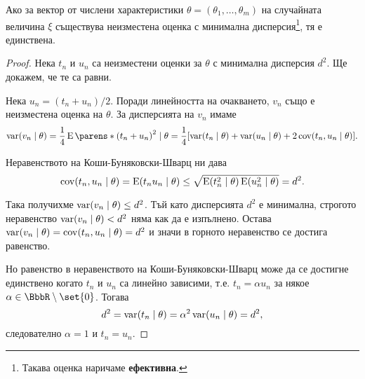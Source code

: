 \documentclass{../../common/topic}
\begin{document}
\begin{theorem}
  Ако за вектор от числени характеристики \( \theta = (\theta_1, \ldots, \theta_m) \) на случайната величина \( \xi \) съществува неизместена оценка с минимална дисперсия\footnote{Такава оценка наричаме \textbf{ефективна}.}, тя е единствена.
\end{theorem}
\begin{proof}
  Нека \( t_n \) и \( u_n \) са неизместени оценки за \( \theta \) с минимална дисперсия \( d^2 \). Ще докажем, че те са равни.

  Нека \( u_n = (t_n + u_n) / 2 \). Поради линейността на очакването, \( v_n \) също е неизместена оценка на \( \theta \). За дисперсията на \( v_n \) имаме
  \begin{equation*}
    \var(v_n \given \theta)
    =
    \frac 1 4 \Expect \parens*{ {(t_n + u_n)}^2 \given \theta }
    =
    \frac 1 4 [\var(t_n \given \theta) + \var(u_n \given \theta) + 2 \cov(t_n, u_n \given \theta)].
  \end{equation*}

  Неравенството на Коши-Буняковски-Шварц ни дава
  \begin{equation*}
    \cov(t_n, u_n \given \theta)
    =
    \Expect(t_n u_n \given \theta)
    \leq
    \sqrt {\Expect(t_n^2 \given \theta) \Expect(u_n^2 \given \theta)}
    =
    d^2.
  \end{equation*}

  Така получихме \( \var(v_n \given \theta) \leq d^2 \). Тъй като дисперсията \( d^2 \) е минимална, строгото неравенство \( \var(v_n \given \theta) < d^2 \) няма как да е изпълнено. Остава \( \var(v_n \given \theta) = \cov(t_n, u_n \given \theta) = d^2 \) и значи в горното неравенство се достига равенство.

  Но равенство в неравенството на Коши-Буняковски-Шварц може да се достигне единствено когато \( t_n \) и \( u_n \) са линейно зависими, т.е. \( t_n = \alpha u_n \) за някое \( \alpha \in \BbbR \setminus \set{ 0 } \). Тогава
  \begin{equation*}
    d^2 = \var(t_n \given \theta) = \alpha^2 \var(u_n \given \theta) = d^2,
  \end{equation*}
  следователно \( \alpha = 1 \) и \( t_n = u_n \).
\end{proof}
\end{document}
